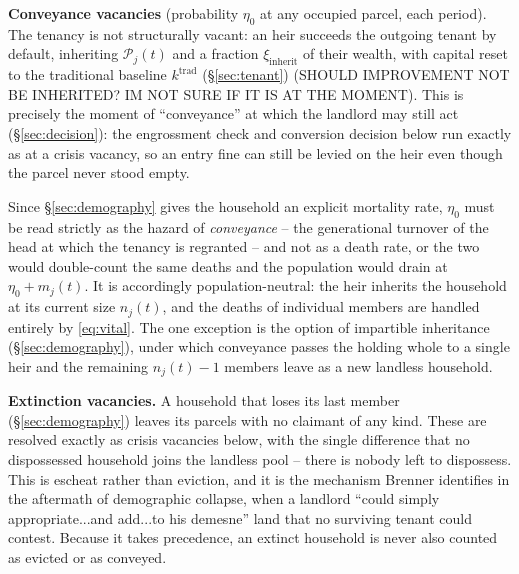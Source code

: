 \documentclass[11pt,english]{article}
\begin{document}
\textbf{Conveyance vacancies} (probability $\eta_0$ at any occupied parcel, each period). The tenancy is not structurally vacant: an heir succeeds the outgoing tenant by default, inheriting $\mathcal{P}_j(t)$ and a fraction $\xi_{\text{inherit}}$ of their wealth, with capital reset to the traditional baseline $k^{\text{trad}}$ (\S\ref{sec:tenant}) (SHOULD IMPROVEMENT NOT BE INHERITED? IM NOT SURE IF IT IS AT THE MOMENT). This is precisely the moment of ``conveyance'' at which the landlord may still act (\S\ref{sec:decision}): the engrossment check and conversion decision below run exactly as at a crisis vacancy, so an entry fine can still be levied on the heir even though the parcel never stood empty.

Since \S\ref{sec:demography} gives the household an explicit mortality rate, $\eta_0$ must be read strictly as the hazard of \emph{conveyance} -- the generational turnover of the head at which the tenancy is regranted -- and not as a death rate, or the two would double-count the same deaths and the population would drain at $\eta_0 + m_j(t)$. It is accordingly population-neutral: the heir inherits the household at its current size $n_j(t)$, and the deaths of individual members are handled entirely by \eqref{eq:vital}. The one exception is the option of impartible inheritance (\S\ref{sec:demography}), under which conveyance passes the holding whole to a single heir and the remaining $n_j(t)-1$ members leave as a new landless household.

\textbf{Extinction vacancies.} A household that loses its last member (\S\ref{sec:demography}) leaves its parcels with no claimant of any kind. These are resolved exactly as crisis vacancies below, with the single difference that no dispossessed household joins the landless pool -- there is nobody left to dispossess. This is escheat rather than eviction, and it is the mechanism Brenner identifies in the aftermath of demographic collapse, when a landlord ``could simply appropriate...and add...to his demesne'' \cite[p.61]{brenner1976agrarian} land that no surviving tenant could contest. Because it takes precedence, an extinct household is never also counted as evicted or as conveyed.
\end{document}
